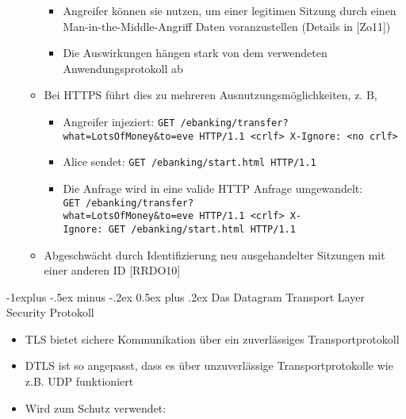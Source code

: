 \documentclass[a4paper]{article}
\makeatletter
\renewcommand{\subsection}{\@startsection{subsection}{2}{0mm}%
 {-1explus -.5ex minus -.2ex}%
 {0.5ex plus .2ex}%
 {\normalfont\normalsize\bfseries}}
\makeatother
\begin{document}
\begin{multicols}{3}
\begin{itemize}
\begin{itemize}
                        \begin{itemize}
                            \item
                                  Angreifer können sie nutzen, um einer legitimen Sitzung durch
                                  einen Man-in-the-Middle-Angriff Daten voranzustellen (Details in
                                  {[}Zo11{]})
                            \item
                                  Die Auswirkungen hängen stark von dem verwendeten
                                  Anwendungsprotokoll ab
                        \end{itemize}
                  \item
                        Bei HTTPS führt dies zu mehreren Ausnutzungsmöglichkeiten, z. B,

                        \begin{itemize}
                            \item
                                  Angreifer injeziert:
                                  \texttt{GET\ /ebanking/transfer?what=LotsOfMoney\&to=eve\ HTTP/1.1\ \textless{}crlf\textgreater{}\ X-Ignore:\ \textless{}no\ crlf\textgreater{}}
                            \item
                                  Alice sendet: \texttt{GET\ /ebanking/start.html\ HTTP/1.1}
                            \item
                                  Die Anfrage wird in eine valide HTTP Anfrage umgewandelt:
                                  \texttt{GET\ /ebanking/transfer?what=LotsOfMoney\&to=eve\ HTTP/1.1\ \textless{}crlf\textgreater{}\ X-Ignore:\ GET\ /ebanking/start.html\ HTTP/1.1}
                        \end{itemize}
                  \item
                        Abgeschwächt durch Identifizierung neu ausgehandelter Sitzungen mit
                        einer anderen ID {[}RRDO10{]}
              \end{itemize}
    \end{itemize}


    \subsection{Das Datagram Transport Layer Security
        Protokoll}

    \begin{itemize}
        \item
              TLS bietet sichere Kommunikation über ein zuverlässiges
              Transportprotokoll
        \item
              DTLS ist so angepasst, dass es über unzuverlässige Transportprotokolle
              wie z.B. UDP funktioniert
        \item
              Wird zum Schutz verwendet:


\end{itemize}
\end{multicols}
\end{document}

